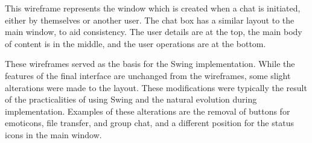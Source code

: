 This wireframe represents the window which is created when a chat is initiated, either by themselves or another user. The chat box has a similar layout to the main window, to aid consistency. The user details are at the top, the main body of content is in the middle, and the user operations are at the bottom.

These wireframes served as the basis for the Swing implementation. While the features of the final interface are unchanged from the wireframes, some slight alterations were made to the layout. These modifications were typically the result of the practicalities of using Swing and the natural evolution during implementation. Examples of these alterations are the removal of buttons for emoticons, file transfer, and group chat, and a different position for the status icons in the main window.
